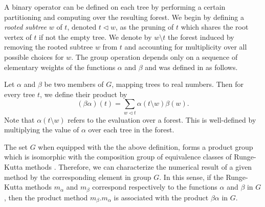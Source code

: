 A binary operator can be defined on each tree by performing a certain partitioning and computing over the resulting forest.  We begin by defining a \emph{rooted subtree} $w$ of $t$, denoted $t \lhd w$, as the pruning of $t$ which shares the root vertex of $t$ if not the empty tree.  We denote by $w \setminus t$ the forest induced by removing the rooted subtree $w$ from $t$ and accounting for multiplicity over all possible choices for $w$. %
The group operation depends only on a sequence of elementary weights of the functions $\alpha$ and $\beta$ and was defined in \cite{Butcher2008_book} as follows.
\begin{definition}\label{def:Group_operation}
	Let $\alpha$ and $\beta$ be two members of $G$, mapping trees to real numbers. Then for every tree $t$, we define their product by
	\begin{equation}\label{eq:Group_operation}
		(\beta\alpha)(t) = \sum_{w \lhd t}\alpha(t \setminus w)\beta(w).
	\end{equation}
	Note that $\alpha(t \setminus w)$ refers to the evaluation over a forest. This is well-defined by multiplying the value of $\alpha$ over each tree in the forest.
\end{definition}
The set $G$ when equipped with the the above definition, forms a product group which is isomorphic with the composition group of equivalence classes of Runge-Kutta methods \cite{Butcher1972, Butcher1987_book}.
Therefore, we can characterize the numerical result of a given method by the corresponding element in group $G$. In this sense, if the Runge-Kutta methods $m_\alpha$ and $m_\beta$ correspond respectively to the functions $\alpha$ and $\beta$ in $G$, then the product method $m_\beta.m_\alpha$ is associated with the product $\beta\alpha$ in $G$.
